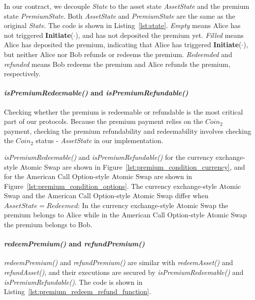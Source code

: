 In our contract, we decouple \textit{State} to the asset state \textit{AssetState} and the premium state \textit{PremiumState}.
Both \textit{AssetState} and \textit{PremiumState} are the same as the original \textit{State}.
The code is shown in Listing~\ref{lst:state}.
\textit{Empty} means Alice has not triggered \textbf{Initiate}($\cdot$), and has not deposited the premium yet.
\textit{Filled} means Alice has deposited the premium, indicating that Alice has triggered \textbf{Initiate}($\cdot$), but neither Alice nor Bob refunds or redeems the premium.
\textit{Redeemded} and \textit{refunded} means Bob redeems the premium and Alice refunds the premium, respectively.

\paragraph{\textit{isPremiumRedeemable()} and \textit{isPremiumRefundable()}}
Checking whether the premium is redeemable or refundable is the most critical part of our protocols.
Because the premium payment relies on the $Coin_2$ payment, checking the premium refundability and redeemability involves checking the $Coin_2$ status - \textit{AssetState} in our implementation.

\textit{isPremiumRedeemable()} and \textit{isPremiumRefundable()} for the currency exchange-style Atomic Swap are shown in Figure~\ref{lst:premium_condition_currency}, and for the American Call Option-style Atomic Swap are shown in Figure~\ref{lst:premium_condition_options}.
The currency exchange-style Atomic Swap and the American Call Option-style Atomic Swap differ when $AssetState = Redeemed$:
In the currency exchange-style Atomic Swap the premium belongs to Alice while in the American Call Option-style Atomic Swap the premium belongs to Bob.

\paragraph{\textit{redeemPremium()} and \textit{refundPremium()}}

\textit{redeemPremium()} and \textit{refundPremium()} are similar with \textit{redeemAsset()} and \textit{refundAsset()}, and their executions are secured by \textit{isPremiumRedeemable()} and \textit{isPremiumRefundable()}.
The code is shown in Listing~\ref{lst:premium_redeem_refund_function}.

